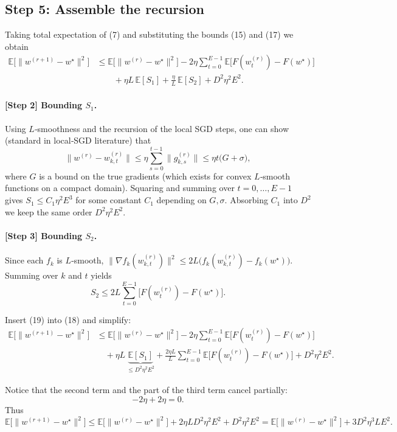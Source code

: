 \documentclass{article}
\newcommand{\E}{\mathbb{E}}
\begin{document}
\subsection*{Step 5: Assemble the recursion}
Taking total expectation of (7) and substituting the bounds (15) and (17) we obtain
\[
\begin{aligned}
\E\!\big[\|w^{(r+1)}-w^\star\|^{2}\big]
&\le
\E\!\big[\|w^{(r)}-w^\star\|^{2}\big]
   -2\eta\sum_{t=0}^{E-1}\E\!\big[F(w_{t}^{(r)})-F(w^\star)\big] \\
&\qquad
   +\eta L\,\E[S_1]
   +\frac{\eta}{L}\,\E[S_2]
   + D^{2}\eta^{2}E^{2}.
\end{aligned}
\tag{18}
\]

\paragraph{[Step 2] Bounding $S_1$.}
Using $L$‑smoothness and the recursion of the local SGD steps,
one can show (standard in local‑SGD literature) that
\[
\|w^{(r)}-w_{k,t}^{(r)}\|
\le \eta\sum_{s=0}^{t-1}\|g_{k,s}^{(r)}\|
\le \eta t\big(G+\sigma\big),
\]
where $G$ is a bound on the true gradients (which exists for convex $L$‑smooth
functions on a compact domain). Squaring and summing over $t=0,\dots,E-1$
gives $S_1\le C_1 \eta^{2}E^{3}$ for some constant $C_1$ depending on $G,\sigma$.
Absorbing $C_1$ into $D^{2}$ we keep the same order $D^{2}\eta^{2}E^{2}$.

\paragraph{[Step 3] Bounding $S_2$.}
Since each $f_k$ is $L$‑smooth, 
$\|\nabla f_k(w_{k,t}^{(r)})\|^{2}\le 2L\big(f_k(w_{k,t}^{(r)})-f_k(w^\star)\big)$.
Summing over $k$ and $t$ yields
\[
S_2 \le 2L\sum_{t=0}^{E-1}\big[F(w_{t}^{(r)})-F(w^\star)\big].
\tag{19}
\]

Insert (19) into (18) and simplify:
\[
\begin{aligned}
\E\!\big[\|w^{(r+1)}-w^\star\|^{2}\big]
&\le
\E\!\big[\|w^{(r)}-w^\star\|^{2}\big]
   -2\eta\!\sum_{t=0}^{E-1}\E\!\big[F(w_{t}^{(r)})-F(w^\star)\big] \\
&\quad
   +\eta L\,\underbrace{\E[S_1]}_{\le D^{2}\eta^{2}E^{2}}
   +\frac{2\eta L}{L}\!\sum_{t=0}^{E-1}\E\!\big[F(w_{t}^{(r)})-F(w^\star)\big]
   + D^{2}\eta^{2}E^{2}.
\end{aligned}
\tag{20}
\]

Notice that the second term and the part of the third term cancel partially:
\[
-2\eta + 2\eta =0.
\]
Thus
\[
\E\!\big[\|w^{(r+1)}-w^\star\|^{2}\big]
\le
\E\!\big[\|w^{(r)}-w^\star\|^{2}\big]
   + 2\eta L D^{2}\eta^{2}E^{2}
   + D^{2}\eta^{2}E^{2}
   = \E\!\big[\|w^{(r)}-w^\star\|^{2}\big]
     + 3 D^{2}\eta^{3}L E^{2}.
\tag{21}
\]
\end{document}
